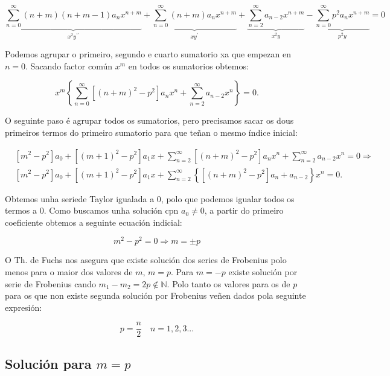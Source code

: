 \documentclass[a4paper,12pt,titlepage]{article}
\begin{document}
$$
\underbrace{\sum_{n=0}^{\infty}(n+m)(n+m-1) a_{n} x^{n+m}}_{x^{2} y^{\prime \prime}}+\underbrace{\sum_{n=0}^{\infty}(n+m) a_{n} x^{n+m}}_{x y^{\prime}}+\underbrace{\sum_{n=2}^{\infty} a_{n-2} x^{n+m}}_{x^{2} y}-\underbrace{\sum_{n=0}^{\infty} p^{2} a_{n} x^{n+m}}_{p^{2} y}=0
$$

Podemos agrupar o primeiro, segundo e cuarto sumatorio xa que empezan en $n=0$. Sacando factor común $x^m$ en todos os sumatorios obtemos:

$$
x^{m}\left\{\sum_{n=0}^{\infty}\left[(n+m)^{2}-p^{2}\right] a_{n} x^{n}+\sum_{n=2}^{\infty} a_{n-2} x^{n}\right\}=0 .
$$

O seguinte paso é agrupar todos os sumatorios, pero precisamos sacar os dous primeiros termos do primeiro sumatorio para que teñan o mesmo índice inicial:

$$
\begin{aligned}
& {\left[m^{2}-p^{2}\right] a_{0}+\left[(m+1)^{2}-p^{2}\right] a_{1} x+\sum_{n=2}^{\infty}\left[(n+m)^{2}-p^{2}\right] a_{n} x^{n}+\sum_{n=2}^{\infty} a_{n-2} x^{n}=0 \Rightarrow} \\
& {\left[m^{2}-p^{2}\right] a_{0}+\left[(m+1)^{2}-p^{2}\right] a_{1} x+\sum_{n=2}^{\infty}\left\{\left[(n+m)^{2}-p^{2}\right] a_{n}+a_{n-2}\right\} x^{n}=0 .}
\end{aligned}
$$

Obtemos unha seriede Taylor igualada a 0, polo que podemos igualar todos os termos a 0. Como buscamos unha solución cpn $a_0\neq0$, a partir do primeiro coeficiente obtemos a seguinte ecuación indicial:

\begin{equation*}
    m^2-p^2 = 0 \Rightarrow m = \pm p
\end{equation*}

O Th. de Fuchs nos asegura que existe solución dos series de Frobenius polo menos para o maior dos valores de $m$, $m=p$. Para $m=-p$ existe solución por serie de Frobenius cando $m_1-m_2=2p \notin \mathbb{N}$. Polo tanto os valores para os de $p$ para os que non existe segunda solución por Frobenius veñen dados pola seguinte expresión:

\begin{equation*}
    p = \frac{n}{2} \quad n=1,2,3...
\end{equation*}

\subsection{Solución para $m=p$}
\end{document}
